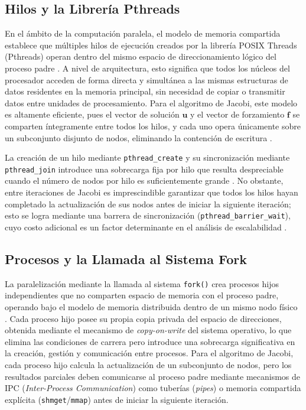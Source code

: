 \subsection{Hilos y la Librería Pthreads}

En el ámbito de la computación paralela, el modelo de memoria compartida establece que
múltiples hilos de ejecución creados por la librería POSIX Threads (Pthreads) operan
dentro del mismo espacio de direccionamiento lógico del proceso padre
\parencite{silberschatz2018os}. A nivel de arquitectura, esto significa que todos los núcleos
del procesador acceden de forma directa y simultánea a las mismas estructuras de datos
residentes en la memoria principal, sin necesidad de copiar o transmitir datos entre
unidades de procesamiento. Para el algoritmo de Jacobi, este modelo es altamente
eficiente, pues el vector de solución $\mathbf{u}$ y el vector de forzamiento $\mathbf{f}$
se comparten íntegramente entre todos los hilos, y cada uno opera únicamente sobre un
subconjunto disjunto de nodos, eliminando la contención de escritura
\parencite{burkardt2011jacobi}.

La creación de un hilo mediante \texttt{pthread\_create} y su sincronización mediante
\texttt{pthread\_join} introduce una sobrecarga fija por hilo que resulta despreciable
cuando el número de nodos por hilo es suficientemente grande \parencite{silberschatz2018os}.
No obstante, entre iteraciones de Jacobi es imprescindible garantizar que todos los hilos
hayan completado la actualización de sus nodos antes de iniciar la siguiente iteración;
esto se logra mediante una barrera de sincronización (\texttt{pthread\_barrier\_wait}),
cuyo costo adicional es un factor determinante en el análisis de escalabilidad
\parencite{hager2010hpc}.

\subsection{Procesos y la Llamada al Sistema Fork}

La paralelización mediante la llamada al sistema \texttt{fork()} crea procesos hijos
independientes que no comparten espacio de memoria con el proceso padre, operando bajo
el modelo de memoria distribuida dentro de un mismo nodo físico \parencite{silberschatz2018os}.
Cada proceso hijo posee su propia copia privada del espacio de direcciones, obtenida
mediante el mecanismo de \textit{copy-on-write} del sistema operativo, lo que elimina las
condiciones de carrera pero introduce una sobrecarga significativa en la creación, gestión
y comunicación entre procesos. Para el algoritmo de Jacobi,
cada proceso hijo calcula la actualización de un subconjunto de nodos, pero los resultados
parciales deben comunicarse al proceso padre mediante mecanismos de IPC
(\textit{Inter-Process Communication}) como tuberías (\textit{pipes}) o memoria
compartida explícita (\texttt{shmget}/\texttt{mmap}) antes de iniciar la siguiente
iteración.

